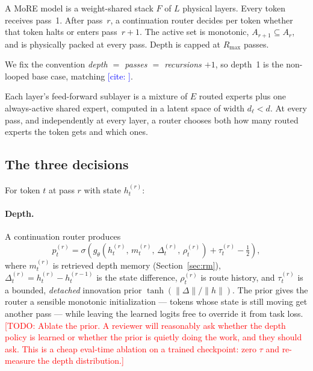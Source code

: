 \documentclass[11pt]{article}
\newcommand{\TODO}[1]{\textcolor{red}{[TODO: #1]}}
\newcommand{\CITE}[1]{\textcolor{blue}{[cite: \detokenize{#1}]}}
\newcommand{\Rmax}{R_{\max}}
\begin{document}
A MoRE model is a weight-shared stack $F$ of $L$ physical layers. Every token
receives pass~1. After pass~$r$, a continuation router decides per token whether
that token halts or enters pass~$r+1$. The active set is monotonic,
$A_{r+1} \subseteq A_r$, and is physically packed at every pass. Depth is capped
at $\Rmax$ passes.

We fix the convention \emph{depth $=$ passes $=$ recursions $+ 1$}, so depth~1 is
the non-looped base case, matching \CITE{ouro2025}.

Each layer's feed-forward sublayer is a mixture of $E$ routed experts plus one
always-active shared expert, computed in a latent space of width $d_\ell < d$.
At every pass, and independently at every layer, a router chooses both how many
routed experts the token gets and which ones.

\subsection{The three decisions}

For token $t$ at pass $r$ with state $h_t^{(r)}$:

\paragraph{Depth.} A continuation router produces
\[
  p_t^{(r)} = \sigma\!\left(g_\theta\!\left(h_t^{(r)},\, m_t^{(r)},\, \Delta_t^{(r)},\, \rho_t^{(r)}\right) + \tau_t^{(r)} - \tfrac{1}{2}\right),
\]
where $m_t^{(r)}$ is retrieved depth memory (Section~\ref{sec:rm}),
$\Delta_t^{(r)} = h_t^{(r)} - h_t^{(r-1)}$ is the state difference,
$\rho_t^{(r)}$ is route history, and $\tau_t^{(r)}$ is a bounded, \emph{detached}
innovation prior $\tanh(\lVert\Delta\rVert / \lVert h \rVert)$. The prior gives
the router a sensible monotonic initialization --- tokens whose state is still
moving get another pass --- while leaving the learned logits free to override it
from task loss.
\TODO{Ablate the prior. A reviewer will reasonably ask whether the depth policy
is learned or whether the prior is quietly doing the work, and they should ask.
This is a cheap eval-time ablation on a trained checkpoint: zero $\tau$ and
re-measure the depth distribution.}
\end{document}
